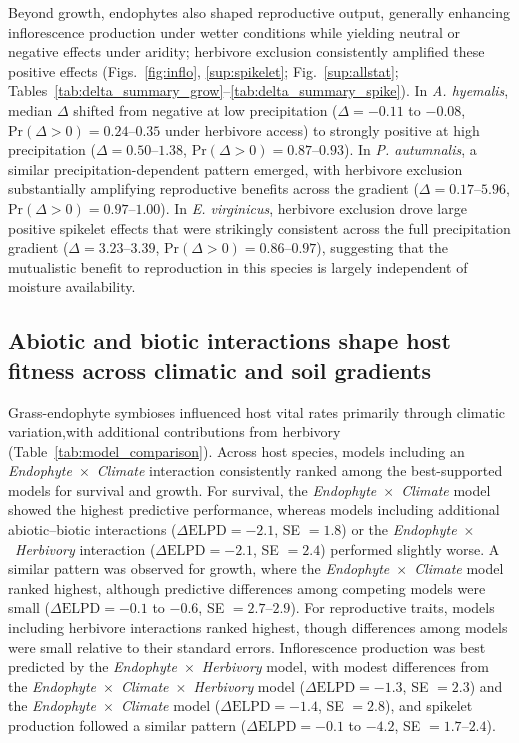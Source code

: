 \documentclass[12pt]{article}\usepackage[]{graphicx}\usepackage[dvipsnames]{xcolor}
\begin{document}
Beyond growth, endophytes also shaped reproductive output, generally enhancing inflorescence production under wetter conditions while yielding neutral or negative effects under aridity; herbivore exclusion consistently amplified these positive effects (Figs.~\ref{fig:inflo}, \ref{sup:spikelet}; Fig.~\ref{sup:allstat}; Tables~\ref{tab:delta_summary_grow}--\ref{tab:delta_summary_spike}).
In \textit{A. hyemalis}, median $\Delta$ shifted from negative at low precipitation ($\Delta = -0.11$ to $-0.08$, $\mathrm{Pr}(\Delta>0) = 0.24$--$0.35$ under herbivore access) to strongly positive at high precipitation ($\Delta = 0.50$--$1.38$, $\mathrm{Pr}(\Delta>0) = 0.87$--$0.93$).
In \textit{P. autumnalis}, a similar precipitation-dependent pattern emerged, with herbivore exclusion substantially amplifying reproductive benefits across the gradient ($\Delta = 0.17$--$5.96$, $\mathrm{Pr}(\Delta>0) = 0.97$--$1.00$).
In \textit{E. virginicus}, herbivore exclusion drove large positive spikelet effects that were strikingly consistent across the full precipitation gradient ($\Delta = 3.23$--$3.39$, $\mathrm{Pr}(\Delta>0) = 0.86$--$0.97$), suggesting that the mutualistic benefit to reproduction in this species is largely independent of moisture availability.

\subsection*{Abiotic and biotic interactions shape host fitness across climatic and soil gradients}
Grass-endophyte symbioses influenced host vital rates primarily through climatic variation,with additional contributions from herbivory (Table~\ref{tab:model_comparison}).
Across host species, models including an \textit{Endophyte}~$\times$~\textit{Climate} interaction consistently ranked among the best-supported models for survival and growth.
For survival, the \textit{Endophyte}~$\times$~\textit{Climate} model showed the highest predictive performance, whereas models including additional abiotic--biotic interactions ($\Delta\mathrm{ELPD} = -2.1$, SE $= 1.8$) or the \textit{Endophyte}~$\times$~\textit{Herbivory} interaction ($\Delta\mathrm{ELPD} = -2.1$, SE $= 2.4$) performed slightly worse.
A similar pattern was observed for growth, where the \textit{Endophyte}~$\times$~\textit{Climate} model ranked highest, although predictive differences among competing models were small ($\Delta\mathrm{ELPD} = -0.1$ to $-0.6$, SE $= 2.7$--$2.9$).
For reproductive traits, models including herbivore interactions ranked highest, though differences among models were small relative to their standard errors.
Inflorescence production was best predicted by the \textit{Endophyte}~$\times$~\textit{Herbivory} model, with modest differences from the \textit{Endophyte}~$\times$~\textit{Climate}~$\times$~\textit{Herbivory} model ($\Delta\mathrm{ELPD} = -1.3$, SE $= 2.3$) and the \textit{Endophyte}~$\times$~\textit{Climate} model ($\Delta\mathrm{ELPD} = -1.4$, SE $= 2.8$), and spikelet production followed a similar pattern ($\Delta\mathrm{ELPD} = -0.1$ to $-4.2$, SE $= 1.7$--$2.4$).
\end{document}
